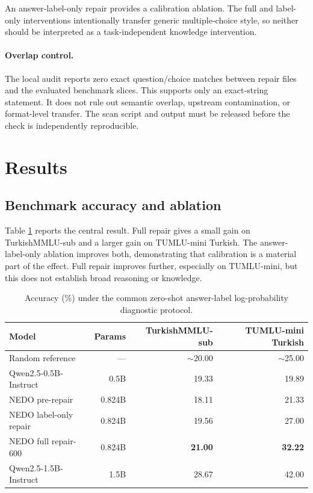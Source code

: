 \documentclass[11pt]{article}
\newcommand{\tmmlu}{TurkishMMLU-sub}
\newcommand{\tumlu}{TUMLU-mini Turkish}
\begin{document}
An answer-label-only repair provides a calibration ablation. The full and
label-only interventions intentionally transfer generic multiple-choice style,
so neither should be interpreted as a task-independent knowledge intervention.

\paragraph{Overlap control.}
The local audit reports zero exact question/choice matches between repair files
and the evaluated benchmark slices. This supports only an exact-string
statement. It does not rule out semantic overlap, upstream contamination, or
format-level transfer. The scan script and output must be released before the
check is independently reproducible.

\section{Results}

\subsection{Benchmark accuracy and ablation}

Table \ref{tab:mainresults} reports the central result. Full repair gives a
small gain on \tmmlu{} and a larger gain on \tumlu{}. The answer-label-only
ablation improves both, demonstrating that calibration is a material part of
the effect. Full repair improves further, especially on TUMLU-mini, but this
does not establish broad reasoning or knowledge.

\begin{table}[t]
\centering
\small
\begin{tabular}{lrrr}
\toprule
\textbf{Model} & \textbf{Params} & \textbf{\tmmlu{}} & \textbf{\tumlu{}} \\
\midrule
Random reference & --- & $\sim$20.00 & $\sim$25.00 \\
Qwen2.5-0.5B-Instruct & 0.5B & 19.33 & 19.89 \\
NEDO pre-repair & 0.824B & 18.11 & 21.33 \\
NEDO label-only repair & 0.824B & 19.56 & 27.00 \\
NEDO full repair-600 & 0.824B & \textbf{21.00} & \textbf{32.22} \\
Qwen2.5-1.5B-Instruct & 1.5B & 28.67 & 42.00 \\
\bottomrule
\end{tabular}
\caption{Accuracy (\%) under the common zero-shot answer-label log-probability
diagnostic protocol.}
\label{tab:mainresults}
\end{table}
\end{document}

